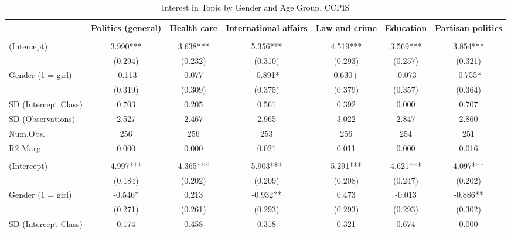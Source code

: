 \documentclass[
  letterpaper,
  DIV=11,
  numbers=noendperiod]{scrreprt}
\begin{document}
\begin{table}
\centering\centering
\caption{Interest in Topic by Gender and Age Group, CCPIS \label{tab:lmeInterestYoungOldCCPIS}}
\centering
\fontsize{6}{8}\selectfont
\begin{tabular}[t]{lcccccc}
\toprule
  & Politics (general) & Health care & International affairs & Law and crime & Education & Partisan politics\\
\midrule
\addlinespace[0.5em]
\multicolumn{7}{l}{\textit{Ages 9--15}}\\
\midrule \hspace{1em}(Intercept) & 3.990*** & 3.638*** & 5.356*** & 4.519*** & 3.569*** & 3.854***\\
\hspace{1em} & (0.294) & (0.232) & (0.310) & (0.293) & (0.257) & (0.321)\\
\hspace{1em}Gender (1 = girl) & -0.113 & 0.077 & -0.891* & 0.630+ & -0.073 & -0.755*\\
\hspace{1em} & (0.319) & (0.309) & (0.375) & (0.379) & (0.357) & (0.364)\\
\hspace{1em}SD (Intercept Class) & 0.703 & 0.205 & 0.561 & 0.392 & 0.000 & 0.707\\
\hspace{1em}SD (Observations) & 2.527 & 2.467 & 2.965 & 3.022 & 2.847 & 2.860\\
\hspace{1em}Num.Obs. & 256 & 256 & 253 & 256 & 254 & 251\\
\hspace{1em}R2 Marg. & 0.000 & 0.000 & 0.021 & 0.011 & 0.000 & 0.016\\
\addlinespace[0.5em]
\multicolumn{7}{l}{\textit{Ages 16--18}}\\
\midrule \hspace{1em}(Intercept) & 4.997*** & 4.365*** & 5.903*** & 5.291*** & 4.621*** & 4.097***\\
\hspace{1em} & (0.184) & (0.202) & (0.209) & (0.208) & (0.247) & (0.202)\\
\hspace{1em}Gender (1 = girl) & -0.546* & 0.213 & -0.932** & 0.473 & -0.013 & -0.886**\\
\hspace{1em} & (0.271) & (0.261) & (0.293) & (0.293) & (0.293) & (0.302)\\
\hspace{1em}SD (Intercept Class) & 0.174 & 0.458 & 0.318 & 0.321 & 0.674 & 0.000\\

\end{tabular}
\end{table}
\end{document}
